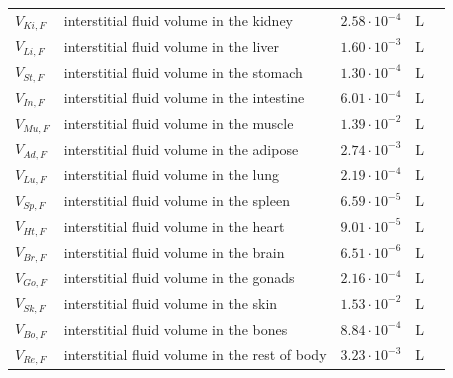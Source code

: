 \documentclass[preprint,12pt,authoryear]{elsarticle}
\begin{document}
\begin{longtable}{P{2cm}P{3.5cm}P{2cm}P{1cm}P{2.5cm}}
$V_{Ki,F}$ & interstitial fluid volume in the kidney & $2.58 \cdot 10^{-4}$ & $\text{L}$ & \citep{larson_1984} \\
$V_{Li,F}$ & interstitial fluid volume in the liver & $1.60 \cdot 10^{-3}$ & $\text{L}$ & \citep{kawai_1994} \\
$V_{St,F}$ & interstitial fluid volume in the stomach & $1.30 \cdot 10^{-4}$ & $\text{L}$ & \citep{kawai_1994} \\
$V_{In,F}$ & interstitial fluid volume in the intestine & $6.01 \cdot 10^{-4}$ & $\text{L}$ & \citep{kawai_1994} \\
$V_{Mu,F}$ & interstitial fluid volume in the muscle & $1.39 \cdot 10^{-2}$ & $\text{L}$ & \citep{kawai_1994} \\
$V_{Ad,F}$ & interstitial fluid volume in the adipose & $2.74 \cdot 10^{-3}$ & $\text{L}$ & \citep{kawai_1994} \\
$V_{Lu,F}$ & interstitial fluid volume in the lung & $2.19 \cdot 10^{-4}$ & $\text{L}$ & \citep{kawai_1994} \\
$V_{Sp,F}$ & interstitial fluid volume in the spleen & $6.59 \cdot 10^{-5}$ & $\text{L}$ & \citep{kawai_1994} \\
$V_{Ht,F}$ & interstitial fluid volume in the heart & $9.01 \cdot 10^{-5}$ & $\text{L}$ & \citep{kawai_1994} \\
$V_{Br,F}$ & interstitial fluid volume in the brain & $6.51 \cdot 10^{-6}$ & $\text{L}$ & \citep{kawai_1994} \\
$V_{Go,F}$ & interstitial fluid volume in the gonads & $2.16 \cdot 10^{-4}$ & $\text{L}$ & \citep{willmann_2003} \\
$V_{Sk,F}$ & interstitial fluid volume in the skin & $1.53 \cdot 10^{-2}$ & $\text{L}$ & \citep{kawai_1994} \\
$V_{Bo,F}$ & interstitial fluid volume in the bones & $8.84 \cdot 10^{-4}$ & $\text{L}$ & \citep{kawai_1994} \\
$V_{Re,F}$ & interstitial fluid volume in the rest of body & $3.23 \cdot 10^{-3}$ & $\text{L}$ & \citep{kawai_1994} \\
\midrule\midrule


\end{longtable}
\end{document}
